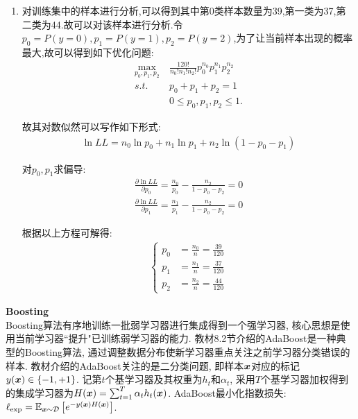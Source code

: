 \documentclass[answers]{exam}  %
\begin{document}
\begin{questions}
	\begin{solution}
		\begin{enumerate}
			\item 对训练集中的样本进行分析,可以得到其中第0类样本数量为39,第一类为37,第二类为44.故可以对该样本进行分析.令$p_0=P(y=0),p_1=P(y=1),p_2=P(y=2)$,为了让当前样本出现的概率最大,故可以得到如下优化问题:
			      \begin{align*}
				      \max\limits_{p_0,p_1,p_2}\  & \frac{120!}{n_0!n_1!n_2!} p_0^{n_0}p_1^{n_1}p_2^{n_2} \\
				      s.t.\                       & p_0+p_1+p_2=1                                         \\
				                                  & 0\leq p_0,p_1,p_2\leq 1.
			      \end{align*}

			      故其对数似然可以写作如下形式:
			      \begin{align*}
				      \ln LL=n_0\ln p_0+n_1\ln p_1+n_2\ln(1-p_0-p_1)
			      \end{align*}

			      对$p_0,p_1$求偏导:
			      \begin{align*}
				      \frac{\partial \ln LL}{\partial p_0}=\frac{n_0}{p_0} -\frac{n_2}{1-p_0-p_2} =0 \\
				      \frac{\partial \ln LL}{\partial p_1}=\frac{n_1}{p_1} -\frac{n_2}{1-p_0-p_2} =0
			      \end{align*}

			      根据以上方程可解得:
			      \begin{align*}
				      \begin{cases}
					      p_0 & =\frac{n_0}{n} =\frac{39}{120} \\
					      p_1 & =\frac{n_1}{n} =\frac{37}{120} \\
					      p_2 & =\frac{n_2}{n} =\frac{44}{120}
				      \end{cases}
			      \end{align*}


		\end{enumerate}
	\end{solution}
	\question [20] \textbf{Boosting} \\
	Boosting算法有序地训练一批弱学习器进行集成得到一个强学习器, 核心思想是使用当前学习器``提升"已训练弱学习器的能力. 教材8.2节介绍的AdaBoost是一种典型的Boosting算法, 通过调整数据分布使新学习器重点关注之前学习器分类错误的样本. 教材介绍的AdaBoost关注的是二分类问题, 即样本${\boldsymbol{x}}$对应的标记$y({\boldsymbol{x}})\in \{-1, +1\}$. 记第$t$个基学习器及其权重为$h_t$和$\alpha_t$, 采用$T$个基学习器加权得到的集成学习器为$H({\boldsymbol{x}})=\sum_{t=1}^T \alpha_t h_t({\boldsymbol{x}})$. AdaBoost最小化指数损失: $\ell_{\text{exp}}=\mathbb{E}_{{\boldsymbol{x}} \sim \mathcal{D}}\left[ e^{-y({\boldsymbol{x}})H({\boldsymbol{x}})} \right]$.


\end{questions}
\end{document}
